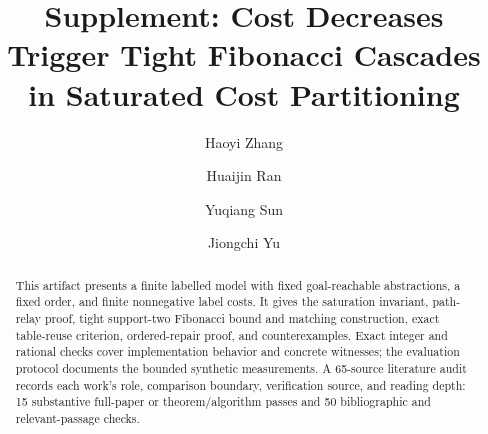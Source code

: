\documentclass[preprint,11pt]{elsarticle}
\begin{document}
\begin{frontmatter}
\title{Supplement: Cost Decreases Trigger Tight Fibonacci Cascades\\in Saturated Cost Partitioning}
\author[xjtlu]{Haoyi Zhang}
\author[ntu]{Huaijin Ran}
\author[ntu]{Yuqiang Sun}
\author[ntu]{Jiongchi Yu}
\address[xjtlu]{Xi'an Jiaotong-Liverpool University, Suzhou, China}
\address[ntu]{Nanyang Technological University, Singapore}
\begin{abstract}
This artifact presents a finite labelled model with fixed goal-reachable abstractions, a fixed order, and finite nonnegative label costs. It gives the saturation invariant, path-relay proof, tight support-two Fibonacci bound and matching construction, exact table-reuse criterion, ordered-repair proof, and counterexamples. Exact integer and rational checks cover implementation behavior and concrete witnesses; the evaluation protocol documents the bounded synthetic measurements. A 65-source literature audit records each work's role, comparison boundary, verification source, and reading depth: 15 substantive full-paper or theorem/algorithm passes and 50 bibliographic and relevant-passage checks.
\end{abstract}
\end{frontmatter}



\FloatBarrier


\end{document}
